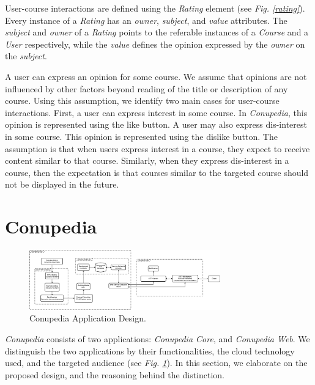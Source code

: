 \documentclass[conference]{IEEEtran}
\begin{document}
        User-course interactions are defined using the \textit{Rating} element (see \textit{Fig. \ref{rating}}). Every instance of a \textit{Rating} has an \textit{owner}, \textit{subject}, and \textit{value} attributes. The \textit{subject} and \textit{owner} of a \textit{Rating} points to the referable instances of a \textit{Course} and a \textit{User} respectively, while the \textit{value} defines the opinion expressed by the \textit{owner} on the \textit{subject}. 
        
        A user can express an opinion for some course. We assume that opinions are not influenced by other factors beyond reading of the title or description of any course. Using this assumption, we identify two main cases for user-course interactions. First, a user can express interest in some course. In \textit{Conupedia}, this opinion is represented using the like button. A user may also express dis-interest in some course. This opinion is represented using the dislike button. The assumption is that when users express interest in a course, they expect to receive content similar to that course. Similarly, when they express dis-interest in a course, then the expectation is that courses similar to the targeted course should not be displayed in the future.
              

  
\newpage
\section{Conupedia}
    \begin{figure}[H]
    \centering
    \includegraphics[width=3.25in]{img/architecture.png}
    \caption{Conupedia Application Design.}
    \label{conupedia_app}
    \end{figure}
    \textit{Conupedia} consists of two applications: \textit{Conupedia Core}, and \textit{Conupedia Web}.
    We distinguish the two applications by their functionalities, the cloud technology used, and the targeted audience (see \textit{Fig. \ref{conupedia_app}}).
    In this section, we elaborate on the proposed design, and the reasoning behind the distinction.
    
\end{document}
